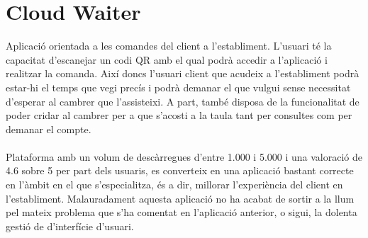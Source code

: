 
\newpage
\section{Cloud Waiter}

Aplicació\cite{cloudwaiter} orientada a les comandes del client a l'establiment. L'usuari té la capacitat d'escanejar un codi QR amb el qual podrà accedir a l'aplicació i realitzar la comanda. Així doncs l'usuari client que acudeix a l'establiment podrà estar-hi el temps que vegi precís i podrà demanar el que vulgui sense necessitat d'esperar al cambrer que l'assisteixi. A part, també disposa de la funcionalitat de poder cridar al cambrer per a que s'acosti a la taula tant per consultes com per demanar el compte.
\\\\
Plataforma amb un volum de descàrregues d'entre 1.000 i 5.000 i una valoració de 4.6 sobre 5 per part dels usuaris, es converteix en una aplicació bastant correcte en l'àmbit en el que s'especialitza, és a dir, millorar l'experiència del client en l'establiment. Malauradament aquesta aplicació no ha acabat de sortir a la llum pel mateix problema que s'ha comentat en l'aplicació anterior, o sigui, la dolenta gestió de d'interfície d'usuari.
\\
